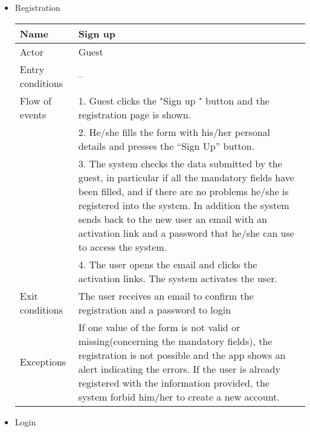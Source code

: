 \begin{itemize}
\item Registration

\begin{table}[!h]
\begin{tabularx}{\linewidth}{l|X}
\centering
Name & Sign up \\ \hline
Actor & Guest \\ \hline
Entry conditions & -- \\ \hline
Flow of events & 1. Guest clicks the "Sign up " button and the registration page is shown. \\
& 2. He/she fills the form with his/her personal details and presses the “Sign Up” button.\\
& 3. The system checks the data submitted by the guest, in particular if all the mandatory fields have been filled, and if there are no problems he/she is registered into the system. In addition the system sends back to the new user an email with an activation link and a password that he/she can use to access the system.\\
& 4. The user opens the email and clicks the activation links. The system activates the user. \\ \hline
Exit conditions & The user receives an email to confirm the registration and a password to login \\ \hline
Exceptions & If one value of the form is not valid or missing(concerning the mandatory fields), the registration is not possible and the app shows an alert indicating the errors. If the user is already registered with the information provided, the system forbid him/her to create a new account. \\
\end{tabularx}
\end{table}

\clearpage

\item Login


\end{itemize}
